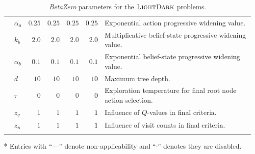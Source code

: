 \begin{table}[b!]
\begin{adjustbox}{max width=\textwidth}
\begin{threeparttable}
\begin{footnotesize}
\begin{tabular}{@{}clrrrrm{9cm}@{}}
              & $\alpha_a$ & $\num{0.25}$ & $\num{0.25}$ & $\num{0.25}$ & $\num{0.25}$ & Exponential action progressive widening value.\\
              & $k_b$ & $\num{2.0}$ & $\num{2.0}$ & $\num{2.0}$ & $\num{2.0}$ & Multiplicative belief-state progressive widening value.\\
              & $\alpha_b$ & $\num{0.1}$ & $\num{0.1}$ & $\num{0.1}$ & $\num{0.1}$ & Exponential belief-state progressive widening value.\\
              & $d$ & $\num{10}$ & $\num{10}$ & $\num{10}$ & $\num{10}$ & Maximum tree depth. \\
              & $\tau$ & $\num{0}$ & $\num{0}$ & $\num{0}$ & $\num{0}$ & Exploration temperature for final root node action selection. \\
              & $z_q$ & $\num{1}$ & $\num{1}$ & $\num{1}$ & $\num{1}$ & Influence of $Q$-values in final criteria. \\
              & $z_n$ & $\num{1}$ & $\num{1}$ & $\num{1}$ & $\num{1}$ & Influence of visit counts in final criteria. \\
            \arrayrulecolor{black} %
            \bottomrule
        \end{tabular}
        \begin{tablenotes}
            \item[*] {Entries with ``---'' denote non-applicability and ``$\cdot$'' denotes they are disabled.}
        \end{tablenotes}
        \end{footnotesize}
    \end{threeparttable}
    \end{adjustbox}
    \caption{\textit{BetaZero} parameters for the $\textsc{LightDark}$ problems.}\label{tab:ld_params}
\end{table}


